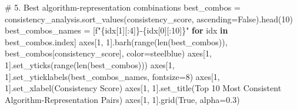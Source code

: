 \documentclass[
  letterpaper,
  DIV=11,
  numbers=noendperiod]{scrartcl}
\newenvironment{Shaded}{\begin{snugshade}}{\end{snugshade}}
\newcommand{\BuiltInTok}[1]{\textcolor[rgb]{0.00,0.23,0.31}{#1}}
\newcommand{\CommentTok}[1]{\textcolor[rgb]{0.37,0.37,0.37}{#1}}
\newcommand{\ControlFlowTok}[1]{\textcolor[rgb]{0.00,0.23,0.31}{\textbf{#1}}}
\newcommand{\DecValTok}[1]{\textcolor[rgb]{0.68,0.00,0.00}{#1}}
\newcommand{\FloatTok}[1]{\textcolor[rgb]{0.68,0.00,0.00}{#1}}
\newcommand{\KeywordTok}[1]{\textcolor[rgb]{0.00,0.23,0.31}{\textbf{#1}}}
\newcommand{\NormalTok}[1]{\textcolor[rgb]{0.00,0.23,0.31}{#1}}
\newcommand{\OperatorTok}[1]{\textcolor[rgb]{0.37,0.37,0.37}{#1}}
\newcommand{\SpecialCharTok}[1]{\textcolor[rgb]{0.37,0.37,0.37}{#1}}
\newcommand{\SpecialStringTok}[1]{\textcolor[rgb]{0.13,0.47,0.30}{#1}}
\newcommand{\StringTok}[1]{\textcolor[rgb]{0.13,0.47,0.30}{#1}}
\newcommand{\VariableTok}[1]{\textcolor[rgb]{0.07,0.07,0.07}{#1}}
\renewenvironment{Shaded}{%
  \begin{tcolorbox}[%
    enhanced,%
    colback=codebg,%
    colframe=codebg,%
    borderline west={3pt}{0pt}{sectionblue},%
    fontupper=\small\ttfamily,%
    boxrule=0pt,%
    arc=0pt,%
    boxsep=5pt,%
    left=2mm,%
    right=2mm,%
    top=2mm,%
    bottom=2mm%
  ]%
}{%
  \end{tcolorbox}%
}
\begin{document}
\begin{Shaded}
\begin{Highlighting}[]
\CommentTok{\# 5. Best algorithm{-}representation combinations}
\NormalTok{best\_combos }\OperatorTok{=}\NormalTok{ consistency\_analysis.sort\_values(}\StringTok{\textquotesingle{}consistency\_score\textquotesingle{}}\NormalTok{, ascending}\OperatorTok{=}\VariableTok{False}\NormalTok{).head(}\DecValTok{10}\NormalTok{)}
\NormalTok{best\_combos\_names }\OperatorTok{=}\NormalTok{ [}\SpecialStringTok{f"}\SpecialCharTok{\{}\NormalTok{idx[}\DecValTok{1}\NormalTok{][:}\DecValTok{4}\NormalTok{]}\SpecialCharTok{\}}\SpecialStringTok{{-}}\SpecialCharTok{\{}\NormalTok{idx[}\DecValTok{0}\NormalTok{][:}\DecValTok{10}\NormalTok{]}\SpecialCharTok{\}}\SpecialStringTok{"} \ControlFlowTok{for}\NormalTok{ idx }\KeywordTok{in}\NormalTok{ best\_combos.index]}
\NormalTok{axes[}\DecValTok{1}\NormalTok{, }\DecValTok{1}\NormalTok{].barh(}\BuiltInTok{range}\NormalTok{(}\BuiltInTok{len}\NormalTok{(best\_combos)), best\_combos[}\StringTok{\textquotesingle{}consistency\_score\textquotesingle{}}\NormalTok{], color}\OperatorTok{=}\StringTok{\textquotesingle{}steelblue\textquotesingle{}}\NormalTok{)}
\NormalTok{axes[}\DecValTok{1}\NormalTok{, }\DecValTok{1}\NormalTok{].set\_yticks(}\BuiltInTok{range}\NormalTok{(}\BuiltInTok{len}\NormalTok{(best\_combos)))}
\NormalTok{axes[}\DecValTok{1}\NormalTok{, }\DecValTok{1}\NormalTok{].set\_yticklabels(best\_combos\_names, fontsize}\OperatorTok{=}\DecValTok{8}\NormalTok{)}
\NormalTok{axes[}\DecValTok{1}\NormalTok{, }\DecValTok{1}\NormalTok{].set\_xlabel(}\StringTok{\textquotesingle{}Consistency Score\textquotesingle{}}\NormalTok{)}
\NormalTok{axes[}\DecValTok{1}\NormalTok{, }\DecValTok{1}\NormalTok{].set\_title(}\StringTok{\textquotesingle{}Top 10 Most Consistent Algorithm{-}Representation Pairs\textquotesingle{}}\NormalTok{)}
\NormalTok{axes[}\DecValTok{1}\NormalTok{, }\DecValTok{1}\NormalTok{].grid(}\VariableTok{True}\NormalTok{, alpha}\OperatorTok{=}\FloatTok{0.3}\NormalTok{)}


\end{Highlighting}
\end{Shaded}
\end{document}
